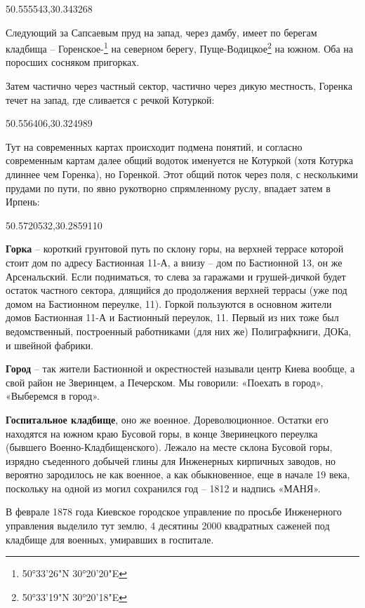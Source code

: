 50.555543,30.343268

Следующий за Сапсаевым пруд на запад, через дамбу, имеет по берегам кладбища – Горенс\-кое-\footnote{50°33'26"N 30°20'20"E} на северном берегу, Пуще-Водицкое\footnote{50°33'19"N   30°20'18"E} на южном. Оба на поросших сосняком пригорках.

Затем частично через частный сектор, частично через дикую местность, Горенка течет на запад, где сливается с речкой Котуркой:

50.556406,30.324989

Тут на современных картах происходит подмена понятий, и согласно современным картам далее общий водоток именуется не Котуркой (хотя Котурка длиннее чем Горенка), но Горенкой. Этот общий поток через поля, с несколькими прудами по пути, по явно рукотворно спрямленному руслу, впадает затем в Ирпень:

50.5720532,30.2859110\\

\medskip


\textbf{Горка} – короткий грунтовой путь по склону горы, на верхней террасе которой стоит дом по адресу Бастионная 11-А, а внизу – дом по Бастионной 13, он же Арсенальский. Если подниматься, то слева за гаражами и грушей-дичкой будет остаток частного сектора, длящийся до продолжения верхней террасы (уже под домом на Бастионном переулке, 11). Горкой пользуются в основном жители домов Бастионная 11-А и Бастионный переулок, 11. Первый из них тоже был ведомственный, построенный работниками (для них же) Полиграфкниги, ДОКа, и швейной фабрики.\\

\medskip


\textbf{Город} – так жители Бастионной и окрестностей называли центр Киева вообще, а свой район не Зверинцем, а Печерском. Мы говорили: «Поехать в город», «Выберемся в город».\\

\medskip

\textbf{Госпитальное кладбище}, оно же военное. Дореволюционное. Остатки его находятся на южном краю Бусовой горы, в конце Зверинецкого переулка (бывшего Военно-Кладбищенско\-го). Лежало на месте склона Бусовой горы, изрядно съеденного добычей глины для Инженерных кирпичных заводов, но вероятно зародилось не как военное, а как обыкновенное, еще в начале 19 века, поскольку на одной из могил сохранился год – 1812 и надпись «МАНЯ».

В феврале 1878 года Киевское городское управление по просьбе Инженерного управления выделило тут землю, 4 десятины 2000 квадратных саженей под кладбище для военных, умиравших в госпитале. 

